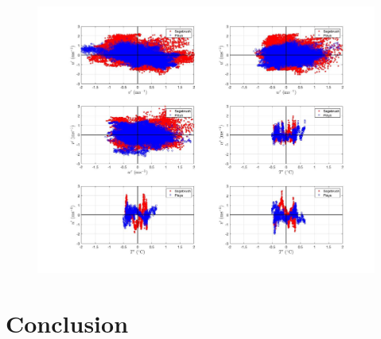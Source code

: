 \documentclass[]{article}
\begin{document}
\begin{figure}
	\centering
	\includegraphics[width=\textwidth]{momentum_corr_20m}
	\caption{}
	\label{fig:u_T}
\end{figure}



\section{Conclusion}
\end{document}
